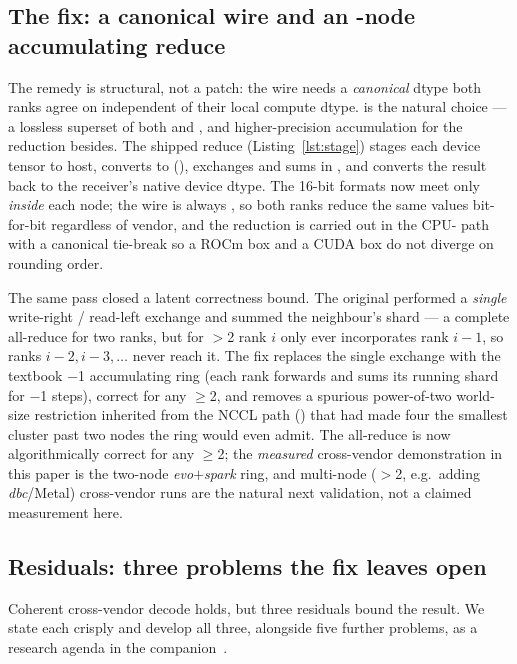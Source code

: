 \documentclass[11pt]{article}
\begin{document}
\subsection{The fix: a canonical  wire and an -node accumulating reduce}
\label{sec:fix}

The remedy is structural, not a patch: the wire needs a \emph{canonical} dtype both ranks agree on
independent of their local compute dtype.  is the natural choice --- a lossless superset of both
 and , and higher-precision accumulation for the reduction besides. The shipped
reduce (Listing~\ref{lst:stage}) stages each device tensor to host, converts to 
(), exchanges and sums in , and converts the result back to the receiver's
native device dtype. The 16-bit formats now meet only \emph{inside} each node; the wire is always
, so both ranks reduce the same values bit-for-bit regardless of vendor, and the reduction is
carried out in the CPU- path with a canonical tie-break so a ROCm box and a CUDA box do not
diverge on rounding order.

The same pass closed a latent correctness bound. The original  performed a
\emph{single} write-right / read-left exchange and summed the neighbour's shard --- a complete all-reduce
for two ranks, but for $>$2 rank $i$ only ever incorporates rank $i{-}1$, so ranks $i{-}2,
i{-}3,\dots$ never reach it. The fix replaces the single exchange with the textbook $-$1
accumulating ring (each rank forwards and sums its running shard for $-$1 steps), correct for any
$\geq$2, and removes a spurious power-of-two world-size restriction inherited from the NCCL path
() that had made four the smallest cluster past two nodes the ring would even
admit. The all-reduce is now algorithmically correct for any $\geq$2; the \emph{measured}
cross-vendor demonstration in this paper is the two-node \emph{evo}$+$\emph{spark} ring, and multi-node
($>$2, e.g.\ adding \emph{dbc}/Metal) cross-vendor runs are the natural next validation, not a
claimed measurement here.

\subsection{Residuals: three problems the fix leaves open}
\label{sec:residual}

Coherent cross-vendor decode holds, but three residuals bound the result. We state each crisply and
develop all three, alongside five further problems, as a research agenda in the companion~\cite{openproblems}.
\end{document}
